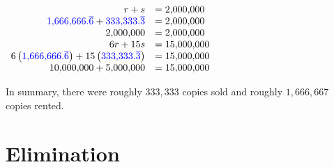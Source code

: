 \documentclass[nooutcomes]{ximera}
\begin{document}
\begin{example}
\begin{explanation}
\begin{center}
$
      \begin{array}{rl}
          r+s &=2{,}000{,}000\\ 
          {\color{blue}{{1{,}666{,}666.\overline{6}}}}+{\color{blue}{{333{,}333.\overline{3}}}} &=2{,}000{,}000\\ 
          2{,}000{,}000&=2{,}000{,}000\\
6r+15s &=15{,}000{,}000\\
6\left({\color{blue}{{1{,}666{,}666.\overline{6}}}}\right)+15\left({\color{blue}{{333{,}333.\overline{3}}}}\right) &=15{,}000{,}000\\
 10{,}000{,}000+5{,}000{,}000 & =15{,}000{,}000
      \end{array}
$
\end{center}
        In summary, there were roughly
        $333{,}333$ copies sold and roughly $1{,}666{,}667$ copies rented.
        \end{explanation}
\end{example}



\section{Elimination}
\end{document}
